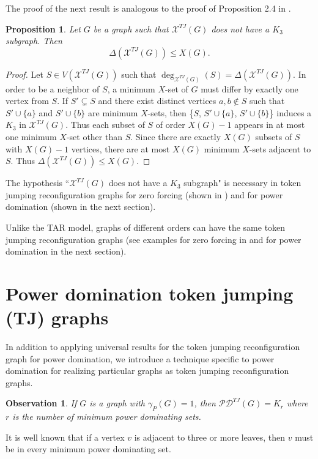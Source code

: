 \documentclass{article}
\numberwithin{figure}{section}   %
\newtheorem{prop}[thm]{Proposition}
\newtheorem{obs}[thm]{Observation}
\theoremstyle{definition}
\theoremstyle{definition}
\theoremstyle{definition}
\newcommand{\bpf}{\begin{proof}}
\newcommand{\epf}{\end{proof}\ms}
\newcommand{\ms}{\medskip}
\newcommand{\pd}{\gamma_P}
\newcommand{\te}{\mathscr{PD}^{TJ}}
\newcommand{\xte}{\mathscr{X}^{TJ}}
\begin{document}
The proof of the next result is analogous to the proof of Proposition 2.4 in \cite{GHH}.

\begin{prop}\label{p:Delta}
Let $G$ be a graph such that $\xte(G)$ does not have a $K_3$ subgraph. Then \[\Delta(\xte(G))\le X(G).\]  
 \end{prop}
\bpf Let  $S\in V(\xte(G))$ such that $\deg_{\xte(G)}(S)=\Delta(\xte(G))$.  In order to be a neighbor of $S$, a minimum $X$-set of $G$ must differ by exactly one vertex from $S$.    If $S'\subsetneq  S$ and there exist distinct vertices $a,b\not \in S$ such  that $S'\cup\{a\}$ and $S'\cup\{b\}$ are minimum $X$-sets, then \{$S$, $S'\cup\{a\}$,  $S'\cup\{b\}$\} induces a $K_3$ in $\xte(G)$.  Thus each subset of $S$  of order $X(G)-1$ appears in at most one minimum $X$-set other than $S$.  Since there are exactly $X(G)$ subsets of $S$ with $X(G)-1$ vertices, there are at most $X(G)$ minimum $X$-sets  adjacent to $S$.  Thus $\Delta(\xte(G))\le X(G)$.
\epf

The hypothesis ``$\xte(G)$ does not have a $K_3$ subgraph" is necessary in token jumping reconfiguration graphs for zero forcing (shown in \cite{GHH}) and for power domination (shown in the next section).%

Unlike the TAR model, graphs of different orders can have the same token jumping reconfiguration graphs (see examples for zero forcing in \cite{GHH}  and  for power domination in the next section).


\section{Power domination token jumping (TJ) graphs}\label{s:TE}

In addition to applying universal results for the  token jumping reconfiguration graph for power domination, we introduce a technique specific to power domination for realizing particular graphs as token jumping reconfiguration graphs. 
\begin{obs}
If $G$ is a graph with $\pd(G)=1$, then $\te(G)=K_r$ where $r$ is the number of minimum power dominating sets.
\end{obs}

It is well known that if a vertex $v$ is adjacent to three or more leaves, then $v$ must be in every minimum power dominating set.
\end{document}
